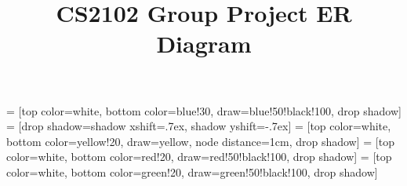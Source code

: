 \documentclass[a4paper,12pt,landscape]{article}
\begin{document}
\title{CS2102 Group Project ER Diagram}

\thispagestyle{empty}

\usetikzlibrary{positioning}
\usetikzlibrary{shadows}

 = [top color=white, bottom color=blue!30,
                            draw=blue!50!black!100, drop shadow]
 = [drop shadow={shadow xshift=.7ex,
                                 shadow yshift=-.7ex}]
 = [top color=white, bottom color=yellow!20,
                               draw=yellow, node distance=1cm, drop shadow]
 = [top color=white, bottom color=red!20,
                                  draw=red!50!black!100, drop shadow]
 = [top color=white, bottom color=green!20,
                         draw=green!50!black!100, drop shadow]
\end{document}
